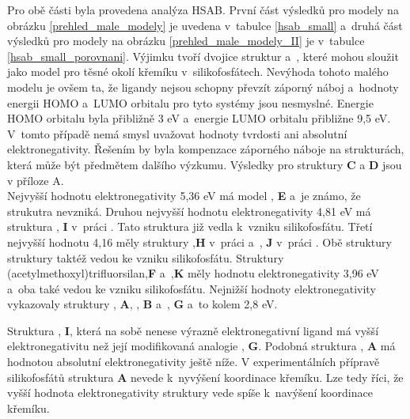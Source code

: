\documentclass[
digital, %
table,   %
nolof,     %
nolot,     %
oneside,
]{fithesis3}
\begin{document}
Pro obě části byla provedena analýza HSAB. První část výsledků pro modely na obrázku \ref{prehled_male_modely} je uvedena v~tabulce \ref{hsab_small} a~druhá část výsledků pro modely na obrázku \ref{prehled_male_modely_II} je v~tabulce \ref{hsab_small_porovnani}. Výjimku tvoří dvojice struktur  a~, které mohou sloužit jako model pro těsné okolí křemíku v~silikofosfátech. Nevýhoda tohoto malého modelu je ovšem ta, že ligandy nejsou schopny převzít záporný náboj a~hodnoty energii HOMO a~LUMO orbitalu pro tyto systémy jsou nesmyslné. Energie HOMO orbitalu byla přibližně 3 eV a~energie LUMO orbitalu přibližne 9,5 eV. V~tomto případě nemá smysl uvažovat hodnoty tvrdosti ani absolutní elektronegativity. Řešením by byla kompenzace záporného náboje na strukturách, která může být předmětem dalšího výzkumu. Výsledky pro struktury \textbf{C} a \textbf{D} jsou v příloze A.\\

Nejvyšší hodnotu elektronegativity 5,36 eV má model , \textbf{E} a~je známo, že strukutra  nevzniká. Druhou nejvyšší hodnotu elektronegativity 4,81 eV má struktura , \textbf{I} v~práci \cite{jahnigen2012synthesis}. Tato struktura již vedla k~vzniku silikofosfátu. Třetí nejvyšší hodnotu 4,16 měly struktury ,\textbf{H} v~práci \cite{aksamentova2009synthesis} a~, \textbf{J} v~práci \cite{Styskalik2015thesis}. Obě struktury struktury taktéž vedou ke vzniku silikofosfátu. Struktury (acetylmethoxyl)trifluorsilan,\textbf{F} a~,\textbf{K} měly hodnotu elektronegativity 3,96 eV a~oba také vedou ke vzniku silikofosfátu. Nejnižší hodnoty elektronegativity vykazovaly struktury , \textbf{A}, , \textbf{B} a~, \textbf{G} a~to kolem 2,8 eV.

Struktura , \textbf{I}, která na sobě nenese výrazně elektronegativní ligand má vyšší elektronegativitu než její modifikovaná analogie , \textbf{G}. Podobná struktura , \textbf{A} má hodnotou absolutní elektronegativity ještě níže. V experimentálních přípravě silikofosfátů struktura \textbf{A} nevede k~nyvýšení koordinace křemíku. Lze tedy říci, že vyšší hodnota elektronegativity struktury vede spíše k~navýšení koordinace křemíku.
\end{document}
